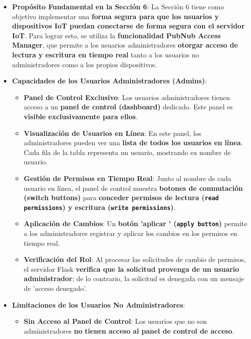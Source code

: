 \documentclass{report}
\begin{document}
\begin{itemize}
    \item \textbf{Propósito Fundamental en la Sección 6}: La Sección 6 tiene como objetivo implementar una \textbf{forma segura para que los usuarios y 
    dispositivos IoT puedan conectarse de forma segura con el servidor IoT}. Para lograr esto, se utiliza la \textbf{funcionalidad PubNub Access Manager}, 
    que permite a los usuarios administradores \textbf{otorgar acceso de lectura y escritura en tiempo real} tanto a los usuarios no administradores como 
    a los propios dispositivos.
    \item \textbf{Capacidades de los Usuarios Administradores (Admins)}:
    \begin{itemize}
        \item \textbf{Panel de Control Exclusivo}: Los usuarios administradores tienen acceso a un \textbf{panel de control (dashboard)} dedicado. 
        Este panel es \textbf{visible exclusivamente para ellos}.
        \item \textbf{Visualización de Usuarios en Línea}: En este panel, los administradores pueden ver una \textbf{lista de todos los usuarios en línea}. 
        Cada fila de la tabla representa un usuario, mostrando su nombre de usuario.
        \item \textbf{Gestión de Permisos en Tiempo Real}: Junto al nombre de cada usuario en línea, el panel de control muestra \textbf{botones de conmutación 
        (switch buttons)} para \textbf{conceder permisos de lectura (\texttt{read permissions}) y escritura (\texttt{write permissions})}.
        \item \textbf{Aplicación de Cambios}: Un \textbf{botón  'aplicar ' (\texttt{apply button})} permite a los administradores registrar y aplicar los 
        cambios en los permisos en tiempo real.
        \item \textbf{Verificación del Rol}: Al procesar las solicitudes de cambio de permisos, el servidor Flask \textbf{verifica que la solicitud provenga 
        de un usuario administrador}; de lo contrario, la solicitud es denegada con un mensaje de  'acceso denegado'.
    \end{itemize}
    \item \textbf{Limitaciones de los Usuarios No Administradores}:
    \begin{itemize}
        \item \textbf{Sin Acceso al Panel de Control}: Los usuarios que no son administradores \textbf{no tienen acceso al panel de control de acceso}. 

\end{itemize}
\end{itemize}
\end{document}

